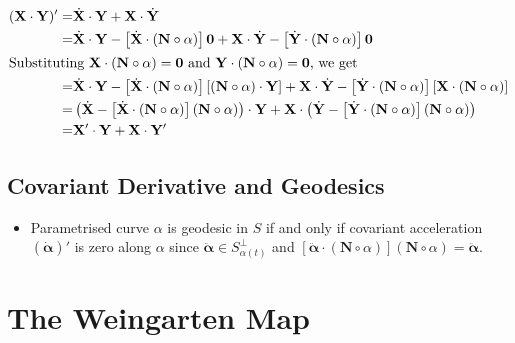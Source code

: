 \begin{enumerate}
\begin{align*}
		(\mathbf{X} \cdot \mathbf{Y})' = & \dot{\mathbf{X}} \cdot \mathbf{Y} + \mathbf{X} \cdot \dot{\mathbf{Y}}\\
		= & \dot{\mathbf{X}} \cdot \mathbf{Y} - \left[ \dot{\mathbf{X}} \cdot (\mathbf{N} \circ \alpha) \right]\mathbf{0} + \mathbf{X} \cdot \dot{\mathbf{Y}} - \left[ \dot{\mathbf{Y}} \cdot (\mathbf{N} \circ \alpha) \right]\mathbf{0} \\
		\intertext{Substituting $\mathbf{X} \cdot (\mathbf{N} \circ \alpha ) = \mathbf{0}$ and $\mathbf{Y} \cdot (\mathbf{N} \circ \alpha) = \mathbf{0}$, we get}
		= & \dot{\mathbf{X}} \cdot \mathbf{Y} - \left[ \dot{\mathbf{X}} \cdot (\mathbf{N} \circ \alpha) \right] \left[ (\mathbf{N} \circ \alpha) \cdot \mathbf{Y} \right] + \mathbf{X} \cdot \dot{\mathbf{Y}} - \left[ \dot{\mathbf{Y}} \cdot (\mathbf{N} \circ \alpha) \right] \left[ \mathbf{X} \cdot (\mathbf{N} \circ \alpha) \right] \\
		= & \left( \dot{\mathbf{X}} - \left[ \dot{\mathbf{X}} \cdot (\mathbf{N} \circ \alpha) \right] (\mathbf{N} \circ \alpha) \right) \cdot \mathbf{Y} + \mathbf{X} \cdot \left( \dot{\mathbf{Y}} - \left[ \dot{\mathbf{Y}} \cdot (\mathbf{N} \circ \alpha) \right](\mathbf{N} \circ \alpha) \right) \\
		= & \mathbf{X}' \cdot \mathbf{Y} + \mathbf{X} \cdot \mathbf{Y}'
	\end{align*}
\end{enumerate}

\subsection{Covariant Derivative and Geodesics}
\begin{itemize}
	\item Parametrised curve $\alpha$ is geodesic in $S$ if and only if covariant acceleration $(\dot{\boldsymbol{\alpha}})'$ is zero along $\alpha$ since $\ddot{\boldsymbol{\alpha}} \in S_{\alpha(t)}^\perp$ and  $\left[ \ddot{\boldsymbol{\alpha}} \cdot (\mathbf{N} \circ \alpha) \right] (\mathbf{N} \circ \alpha) = \ddot{\boldsymbol{\alpha}}$.
\end{itemize}
\section{The Weingarten Map}

